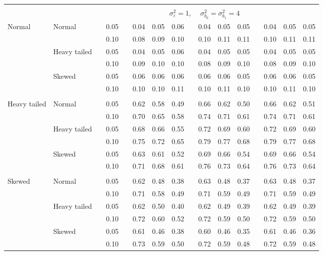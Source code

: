 \documentclass{article} %
\begin{document}
\begin{table}[ht]
\begin{scriptsize}
\begin{center}
\begin{tabular}{ll p{.1cm} c p{.1cm} rrr p{.1cm} rrr p{.1cm} rrr}
&&&&&&&&&&&&&&&\\
& && && \multicolumn{9}{c}{$\sigma_{\varepsilon}^2 = 1$, \ \ $\sigma_{b_0}^2 = \sigma_{b_1}^2 = 4$} \\ \cline{6-16}
\rowcolor{gray!20}Normal       & Normal       && 0.05 &&   0.04 & 0.05 & 0.06 && 0.04 & 0.05 & 0.05 && 0.04 & 0.05 & 0.05 \\ 
\rowcolor{gray!20}             &              && 0.10 &&   0.08 & 0.09 & 0.10 && 0.10 & 0.11 & 0.11 && 0.10 & 0.11 & 0.11 \\ 
\rowcolor{gray!20}             & Heavy tailed && 0.05 &&   0.04 & 0.05 & 0.06 && 0.04 & 0.05 & 0.05 && 0.04 & 0.05 & 0.05 \\ 
\rowcolor{gray!20}             &              && 0.10 &&   0.09 & 0.10 & 0.10 && 0.08 & 0.09 & 0.10 && 0.08 & 0.09 & 0.10 \\ 
\rowcolor{gray!20}             & Skewed       && 0.05 &&   0.06 & 0.06 & 0.06 && 0.06 & 0.06 & 0.05 && 0.06 & 0.06 & 0.05 \\ 
\rowcolor{gray!20}             &              && 0.10 &&   0.10 & 0.10 & 0.11 && 0.10 & 0.11 & 0.10 && 0.10 & 0.11 & 0.10 \\ 
             &&&&&&&&&&&&&&&\\
Heavy tailed & Normal       && 0.05 &&   0.62 & 0.58 & 0.49 && 0.66 & 0.62 & 0.50 && 0.66 & 0.62 & 0.51 \\ 
             &              && 0.10 &&   0.70 & 0.65 & 0.58 && 0.74 & 0.71 & 0.61 && 0.74 & 0.71 & 0.61 \\ 
             & Heavy tailed && 0.05 &&   0.68 & 0.66 & 0.55 && 0.72 & 0.69 & 0.60 && 0.72 & 0.69 & 0.60 \\ 
             &              && 0.10 &&   0.75 & 0.72 & 0.65 && 0.79 & 0.77 & 0.68 && 0.79 & 0.77 & 0.68 \\ 
             & Skewed       && 0.05 &&   0.63 & 0.61 & 0.52 && 0.69 & 0.66 & 0.54 && 0.69 & 0.66 & 0.54 \\ 
             &              && 0.10 &&   0.71 & 0.68 & 0.61 && 0.76 & 0.73 & 0.64 && 0.76 & 0.73 & 0.64 \\ 
             &&&&&&&&&&&&&&&\\
Skewed       & Normal       && 0.05 &&   0.62 & 0.48 & 0.38 && 0.63 & 0.48 & 0.37 && 0.63 & 0.48 & 0.37 \\ 
             &              && 0.10 &&   0.71 & 0.58 & 0.49 && 0.71 & 0.59 & 0.49 && 0.71 & 0.59 & 0.49 \\ 
             & Heavy tailed && 0.05 &&   0.62 & 0.50 & 0.40 && 0.62 & 0.49 & 0.39 && 0.62 & 0.49 & 0.39 \\ 
             &              && 0.10 &&   0.72 & 0.60 & 0.52 && 0.72 & 0.59 & 0.50 && 0.72 & 0.59 & 0.50 \\ 
             & Skewed       && 0.05 &&   0.61 & 0.46 & 0.38 && 0.60 & 0.46 & 0.35 && 0.61 & 0.46 & 0.36 \\ 
             &              && 0.10 &&   0.73 & 0.59 & 0.50 && 0.72 & 0.59 & 0.48 && 0.72 & 0.59 & 0.48 \\ 



\end{tabular}
\end{center}
\end{scriptsize}
\end{table}
\end{document}
